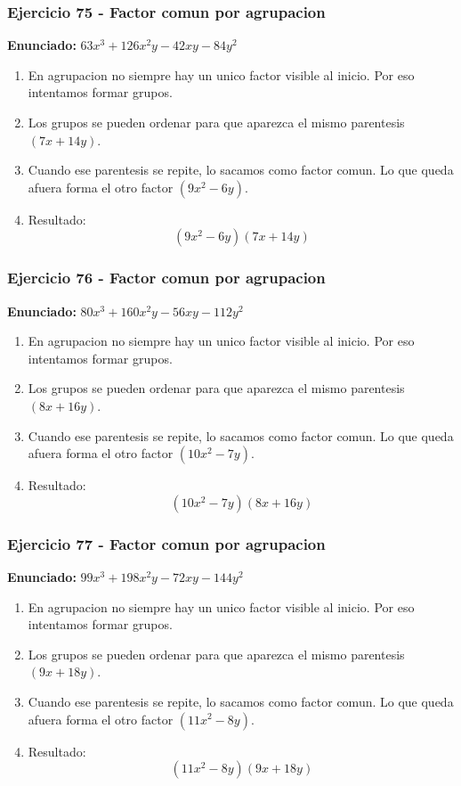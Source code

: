 \documentclass[11pt,a4paper]{article}
\begin{document}
\vspace{0.2cm}
\subsubsection*{Ejercicio 75 - Factor comun por agrupacion}
\textbf{Enunciado:} $ 63 x^{3} + 126 x^{2} y - 42 x y - 84 y^{2} $\par
\begin{enumerate}[leftmargin=2em]
\item En agrupacion no siempre hay un unico factor visible al inicio. Por eso intentamos formar grupos.
\item Los grupos se pueden ordenar para que aparezca el mismo parentesis \((7 x + 14 y)\).
\item Cuando ese parentesis se repite, lo sacamos como factor comun. Lo que queda afuera forma el otro factor \((9 x^{2} - 6 y)\).
\item Resultado: \[\boxed{\left(9 x^{2} - 6 y\right)\left(7 x + 14 y\right)}\]
\end{enumerate}

\vspace{0.2cm}
\subsubsection*{Ejercicio 76 - Factor comun por agrupacion}
\textbf{Enunciado:} $ 80 x^{3} + 160 x^{2} y - 56 x y - 112 y^{2} $\par
\begin{enumerate}[leftmargin=2em]
\item En agrupacion no siempre hay un unico factor visible al inicio. Por eso intentamos formar grupos.
\item Los grupos se pueden ordenar para que aparezca el mismo parentesis \((8 x + 16 y)\).
\item Cuando ese parentesis se repite, lo sacamos como factor comun. Lo que queda afuera forma el otro factor \((10 x^{2} - 7 y)\).
\item Resultado: \[\boxed{\left(10 x^{2} - 7 y\right)\left(8 x + 16 y\right)}\]
\end{enumerate}

\vspace{0.2cm}
\subsubsection*{Ejercicio 77 - Factor comun por agrupacion}
\textbf{Enunciado:} $ 99 x^{3} + 198 x^{2} y - 72 x y - 144 y^{2} $\par
\begin{enumerate}[leftmargin=2em]
\item En agrupacion no siempre hay un unico factor visible al inicio. Por eso intentamos formar grupos.
\item Los grupos se pueden ordenar para que aparezca el mismo parentesis \((9 x + 18 y)\).
\item Cuando ese parentesis se repite, lo sacamos como factor comun. Lo que queda afuera forma el otro factor \((11 x^{2} - 8 y)\).
\item Resultado: \[\boxed{\left(11 x^{2} - 8 y\right)\left(9 x + 18 y\right)}\]
\end{enumerate}
\end{document}
